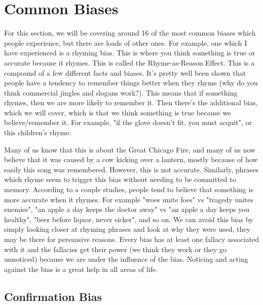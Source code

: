\chapter{Common Biases}
\label{s:biases}
For this section, we will be covering around 16 of the most common biases which people experience, but there are loads of other ones. For example, one which I have experienced is a rhyming bias. This is where you think something is true or accurate because it rhymes. This is called the Rhyme-as-Reason Effect. This is a compound of a few different facts and biases. It's pretty well been shown that people have a tendency to remember things better when they rhyme (why do you think commercial jingles and slogans work?). This means that if something rhymes, then we are more likely to remember it. Then there's the additional bias, which we will cover, which is that we think something is true because we believe/remember it. For example, "if the glove doesn't fit, you must acquit", or this children's rhyme:

Many of us know that this is about the Great Chicago Fire, and many of us now believe that it was caused by a cow kicking over a lantern, mostly because of how easily this song was remembered. However, this is not accurate. Similarly, phrases which rhyme seem to trigger this bias without needing to be committed to memory. According to a couple studies, people tend to believe that something is more accurate when it rhymes. For example "woes unite foes" vs "tragedy unites enemies", "an apple a day keeps the doctor away" vs "an apple a day keeps you healthy", "beer before liquor, never sicker", and so on. We can avoid this bias by simply looking closer at rhyming phrases and look at why they were used, they may be there for persuasive reasons. Every bias has at least one fallacy associated with it and the fallacies get their power (we think they work or they go unnoticed) because we are under the influence of the bias. Noticing and acting against the bias is a great help in all areas of life. 

\section{Confirmation Bias}


